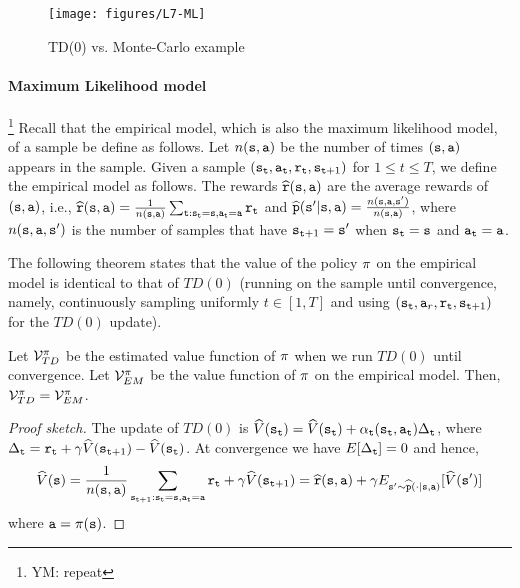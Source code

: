 \begin{figure}
  \begin{centering}
  \texttt{[image: figures/L7-ML]}\\
  \caption{TD(0) vs. Monte-Carlo example}\label{fig:L7-ML}
  \end{centering}
\end{figure}


\paragraph{Maximum Likelihood model}\footnote{YM: repeat} Recall that the empirical model, which is also the
maximum likelihood model, of a sample be define as follows. Let
$n({\tt s},{\tt a})$ be the number of times $({\tt s},{\tt a})$
appears in the sample. Given a sample
$({\tt s}_{\tt t},{\tt a}_{\tt t},{\tt r}_{\tt t},{\tt s}_{{\tt t}+1})$
for $1\leq t\leq T$, we define the empirical model as follows. The
rewards $\widehat{{\tt r}}({\tt s},{\tt a})$ are the average rewards
of $({\tt s},{\tt a})$, i.e.,
$\widehat{{\tt r}}({\tt s},{\tt a})=\frac{1}{n({\tt s},{\tt a})}\sum_{{\tt t}:{\tt s}_{\tt t}={\tt s},{\tt a}_{\tt t}={\tt a}}{\tt r}_{\tt t}$
and
$\widehat{{\tt p}}({\tt s}'|{\tt s},{\tt a})=\frac{n({\tt s},{\tt a},{\tt s}')}{n({\tt s},{\tt a})}$,
where $n({\tt s},{\tt a},{\tt s}')$ is the number of samples that have
${\tt s}_{{\tt t}+1}={\tt s}'$ when ${\tt s}_{\tt t}={\tt s}$ and
${\tt a}_{\tt t} ={\tt a}$.

The following theorem states that the value of the policy $\pi$ on the
empirical model is identical to that of $TD(0)$ (running on the
sample until convergence, namely, continuously sampling uniformly
$t\in[1,T]$ and using $({\tt s}_{\tt t},
{\tt a}_r,{\tt r}_{\tt t},{\tt s}_{{\tt t}+1})$ for the $TD(0)$
update).

\begin{theorem}
Let $\mathcal{V}^\pi_{TD}$ be the estimated value function of
$\pi$ when we run $TD(0)$ until convergence. Let
$\mathcal{V}^\pi_{EM}$ be the value function of $\pi$ on the
empirical model. Then, $\mathcal{V}^\pi_{TD}=\mathcal{V}^\pi_{EM}$.
\end{theorem}

\begin{proof}[Proof sketch]
The update of $TD(0)$ is
$\widehat{V}({\tt s}_{\tt t})=\widehat{V}({\tt s}_{\tt t})+\alpha_{\tt t}({\tt s}_{\tt t},{\tt a}_{\tt t})\Delta_{\tt t}$,
where $\Delta_{\tt t}={\tt r}_{\tt t}+\gamma
\widehat{V}({\tt s}_{{\tt t}+1})-\widehat{V}({\tt s}_{\tt t})$. At
convergence we have $E[\Delta_{\tt t}]=0$ and hence,
\[
\widehat{V}({\tt s})=\frac{1}{n({\tt s},{\tt a})}\sum_{{\tt s}_{{\tt t}+1}:{\tt s}_{\tt t}={\tt s},{\tt a}_{\tt t}={\tt a}}
{\tt r}_{\tt t}+\gamma
\widehat{V}({\tt s}_{{\tt t}+1})=\widehat{{\tt r}}({\tt s},{\tt a})+\gamma
E_{{\tt s}'\sim
\widehat{{\tt p}}(\cdot|{\tt s},{\tt a})}[\widehat{V}({\tt s}')]
\]
where ${\tt a}=\pi({\tt s})$.
\end{proof}

